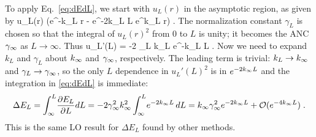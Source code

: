 	To apply Eq.~\eqref{eq:dEdL}, we start with $u_L(r)$ in the asymptotic
	region, as given by
	\beq
  	u_L(r)   \left(e^{-k_L r} - e^{-2k_L L}
		e^{k_L r}\right)
   	\;.
   	\label{eq:uLasymp2}
  \eeq
	The normalization
	constant $\gamma_L$ is chosen so that the integral of $u_L(r)^2$ from
	0 to $L$ is unity; it becomes the ANC $\gamma_\infty$ as
	$L\rightarrow\infty$.  Thus
	\beq
	   u_L'(L) = -2 \gamma_L k_L e^{-k_L L}
	   \;.
	   \label{eq:uLprime}
	\eeq
	Now we need to expand $k_L$ and $\gamma_L$ about $k_{\infty}$ and $\gamma_\infty$,
	respectively.  The leading term is trivial: $k_L \rightarrow k_{\infty}$
	and $\gamma_L \rightarrow \gamma_\infty$, so the only $L$ dependence in
	$u_L'(L)^2$ is in $e^{-2 k_{\infty} L}$ and the integration in
	\eqref{eq:dEdL} is immediate:
	\begin{align}
	\Delta E_L
	     = \int_\infty^L\! \frac{\partial E_L}{\partial L} dL
	     =  -2 \gamma_\infty^2 k_{\infty}^2 \int_\infty^L\! e^{-2k_{\infty} L} \, dL
	     =  k_{\infty} \gamma_\infty^2 e^{-2 k_{\infty} L} +  \mathcal{O}(e^{-4 k_{\infty} L})
	     \;.
	\end{align}
	This is the same LO result for $\Delta E_L$ found by other methods.


